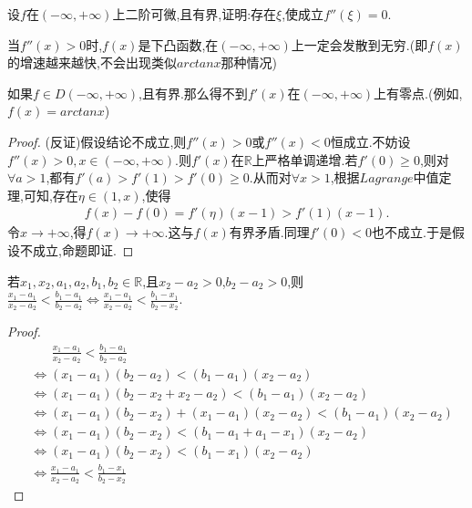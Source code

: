 \documentclass[lang=cn,newtx,10pt,scheme=chinese]{../Template/elegantbook}
\begin{document}
\begin{proposition}\label{pro:二阶导数零点的存在性}
    设\(f\)在\((-\infty,+\infty)\)上二阶可微,且有界,证明:存在\(\xi\),使成立\(f''(\xi)=0\).
\end{proposition}
\begin{note}
    当$f''(x)>0$时,$f(x)$是下凸函数,在$(-\infty,+\infty)$上一定会发散到无穷.(即$f(x)$的增速越来越快,不会出现类似$arctanx$那种情况)
\end{note}
\begin{remark}
    如果$f\in D(-\infty,+\infty)$,且有界.那么得不到$f'(x)$在$(-\infty,+\infty)$上有零点.(例如,$f(x)=arctanx$)
\end{remark}
\begin{proof}
    (反证)假设结论不成立,则$f''(x)>0$或$f''(x)<0$恒成立.不妨设$f''(x)>0,x\in (-\infty,+\infty)$.则$f'(x)$在$\mathbb{R}$上严格单调递增.若$f'(0)\ge0$,则对$\forall a>1$,都有$f'(a)>f'(1)>f'(0)\ge0$.从而对$\forall x>1$,根据$Lagrange$中值定理,可知,存在$\eta \in (1,x)$,使得
    \begin{align*}
        f(x)-f(0)=f'(\eta)(x-1)>f'(1)(x-1).
    \end{align*}
    令$x\to +\infty$,得$f(x)\to +\infty$.这与$f(x)$有界矛盾.同理$f'(0)<0$也不成立.于是假设不成立,命题即证.
\end{proof}

\begin{proposition}\label{pro:分式不等式等价变形}
    若\(x_1,x_2,a_1,a_2,b_1,b_2\in \mathbb{R}\),且\(x_2 - a_2 > 0\),\(b_2 - a_2 > 0\),则\(\frac{x_1 - a_1}{x_2 - a_2} < \frac{b_1 - a_1}{b_2 - a_2} \Leftrightarrow \frac{x_1 - a_1}{x_2 - a_2} < \frac{b_1 - x_1}{b_2 - x_2}\).
\end{proposition}
\begin{proof}
    \begin{align*}
        &\,\,\,\,\,\,\,\,\,\,\frac{x_1-a_1}{x_2-a_2}<\frac{b_1-a_1}{b_2-a_2}
        \\
        &\Leftrightarrow \left( x_1-a_1 \right) \left( b_2-a_2 \right) <\left( b_1-a_1 \right) \left( x_2-a_2 \right) 
\\
&\Leftrightarrow \left( x_1-a_1 \right) \left( b_2-x_2+x_2-a_2 \right) <\left( b_1-a_1 \right) \left( x_2-a_2 \right) 
\\
&\Leftrightarrow \left( x_1-a_1 \right) \left( b_2-x_2 \right) +\left( x_1-a_1 \right) \left( x_2-a_2 \right) <\left( b_1-a_1 \right) \left( x_2-a_2 \right) 
\\
&\Leftrightarrow \left( x_1-a_1 \right) \left( b_2-x_2 \right) <\left( b_1-a_1+a_1-x_1 \right) \left( x_2-a_2 \right) 
\\
&\Leftrightarrow \left( x_1-a_1 \right) \left( b_2-x_2 \right) <\left( b_1-x_1 \right) \left( x_2-a_2 \right) 
\\
&\Leftrightarrow \frac{x_1-a_1}{x_2-a_2}<\frac{b_1-x_1}{b_2-x_2}
    \end{align*}
\end{proof}
\end{document}

